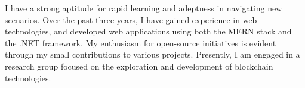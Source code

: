 

\begin{cvparagraph}

I have a strong aptitude for rapid learning and adeptness in navigating new scenarios. Over the past three years, I have gained experience in web technologies, and developed web applications using both the MERN stack and the .NET framework. My enthusiasm for open-source initiatives is evident through my small contributions to various projects. Presently, I am engaged in a research group focused on the exploration and development of blockchain technologies.
\end{cvparagraph}
